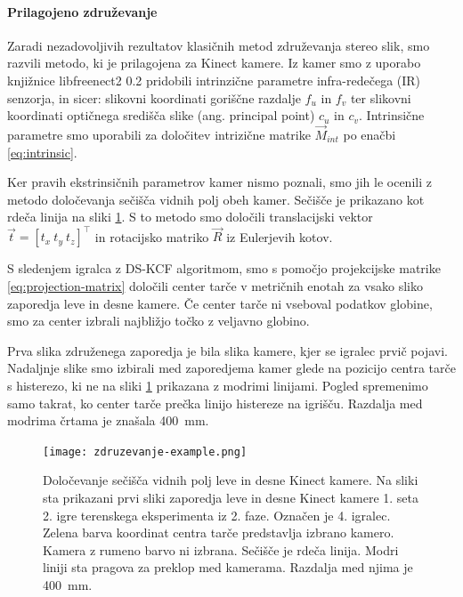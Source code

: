 \paragraph{Prilagojeno združevanje}
Zaradi nezadovoljivih rezultatov klasičnih metod združevanja stereo slik, smo razvili metodo, ki je prilagojena za Kinect kamere. Iz kamer smo z uporabo knjižnice libfreenect2 0.2 \cite{lingzhu2016libfreenect2} pridobili intrinzične parametre infra-redečega (IR) senzorja, in sicer: slikovni koordinati goriščne razdalje $f_u$ in $f_v$ ter slikovni koordinati optičnega središča slike (ang. principal point) $c_u$ in $c_v$. Intrinsične parametre smo uporabili za določitev intrizične matrike $\vec{M}_{int}$ po enačbi \eqref{eq:intrinsic}.


Ker pravih ekstrinsičnih parametrov kamer nismo poznali, smo jih le ocenili z metodo določevanja sečišča vidnih polj obeh kamer. Sečišče je prikazano kot rdeča linija na sliki \ref{fig:zdruzevanje}. S to metodo smo določili translacijski vektor $\vec{t} = \left [ t_x~ t_y~ t_z \right]^\top$ in rotacijsko matriko $\vec{R}$ iz Eulerjevih kotov.

S sledenjem igralca z DS-KCF algoritmom, smo s pomočjo projekcijske matrike \eqref{eq:projection-matrix} določili center tarče v metričnih enotah za vsako sliko zaporedja leve in desne kamere. Če center tarče ni vseboval podatkov globine, smo za center izbrali najbližjo točko z veljavno globino.

Prva slika združenega zaporedja je bila slika kamere, kjer se igralec prvič pojavi. Nadaljnje slike smo izbirali med zaporedjema kamer glede na pozicijo centra tarče s histerezo, ki ne na sliki \ref{fig:zdruzevanje} prikazana z modrimi linijami. Pogled spremenimo samo takrat, ko center tarče prečka linijo histereze na igrišču. Razdalja med modrima črtama je znašala \SI{400}{mm}.


\begin{figure}[!htb]
	\centering
	\texttt{[image: zdruzevanje-example.png]}
	\caption[Določevanje sečišča vidnih polj leve in desne Kinect kamere]{Določevanje sečišča vidnih polj leve in desne Kinect kamere. Na sliki sta prikazani prvi sliki zaporedja leve in desne Kinect kamere 1. seta 2. igre terenskega eksperimenta iz 2. faze. Označen je 4. igralec. Zelena barva koordinat centra tarče predstavlja izbrano kamero. Kamera z rumeno barvo ni izbrana. Sečišče je rdeča linija. Modri liniji sta pragova za preklop med kamerama. Razdalja med njima je \SI{400}{mm}.}
	\label{fig:zdruzevanje}
\end{figure}



